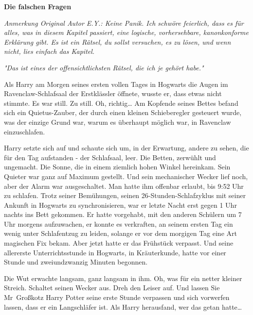 

\hypertarget{die-falschen-fragen}{%

\textbf{Die falschen Fragen}

\emph{Anmerkung Original Autor E.Y.: Keine Panik. Ich schwöre feierlich, dass es für alles, was in diesem Kapitel passiert, eine logische, vorhersehbare, kanonkonforme Erklärung gibt. Es ist ein Rätsel, du sollst versuchen, es zu lösen, und wenn nicht, lies einfach das Kapitel.}

\emph{"Das ist eines der offensichtlichsten Rätsel, die ich je gehört habe."}

Als Harry am Morgen seines ersten vollen Tages in Hogwarts die Augen im Ravenclaw-Schlafsaal der Erstklässler öffnete, wusste er, dass etwas nicht stimmte. Es war still. Zu still. Oh, richtig… Am Kopfende seines Bettes befand sich ein Quietus-Zauber, der durch einen kleinen Schieberegler gesteuert wurde, was der einzige Grund war, warum es überhaupt möglich war, in Ravenclaw einzuschlafen.

Harry setzte sich auf und schaute sich um, in der Erwartung, andere zu sehen, die für den Tag aufstanden - der Schlafsaal, leer. Die Betten, zerwühlt und ungemacht. Die Sonne, die in einem ziemlich hohen Winkel hereinkam. Sein Quieter war ganz auf Maximum gestellt. Und sein mechanischer Wecker lief noch, aber der Alarm war ausgeschaltet. Man hatte ihm offenbar erlaubt, bis 9:52 Uhr zu schlafen. Trotz seiner Bemühungen, seinen 26-Stunden-Schlafzyklus mit seiner Ankunft in Hogwarts zu synchronisieren, war er letzte Nacht erst gegen 1 Uhr nachts ins Bett gekommen. Er hatte vorgehabt, mit den anderen Schülern um 7 Uhr morgens aufzuwachen, er konnte es verkraften, an seinem ersten Tag ein wenig unter Schlafentzug zu leiden, solange er vor dem morgigen Tag eine Art magischen Fix bekam. Aber jetzt hatte er das Frühstück verpasst. Und seine allererste Unterrichtsstunde in Hogwarts, in Kräuterkunde, hatte vor einer Stunde und zweiundzwanzig Minuten begonnen.

Die Wut erwachte langsam, ganz langsam in ihm. Oh, was für ein netter kleiner Streich. Schaltet seinen Wecker aus. Dreh den Leiser auf. Und lassen Sie Mr~Großkotz Harry Potter seine erste Stunde verpassen und sich vorwerfen lassen, dass er ein Langschläfer ist. Als Harry herausfand, wer das getan hatte…

}
